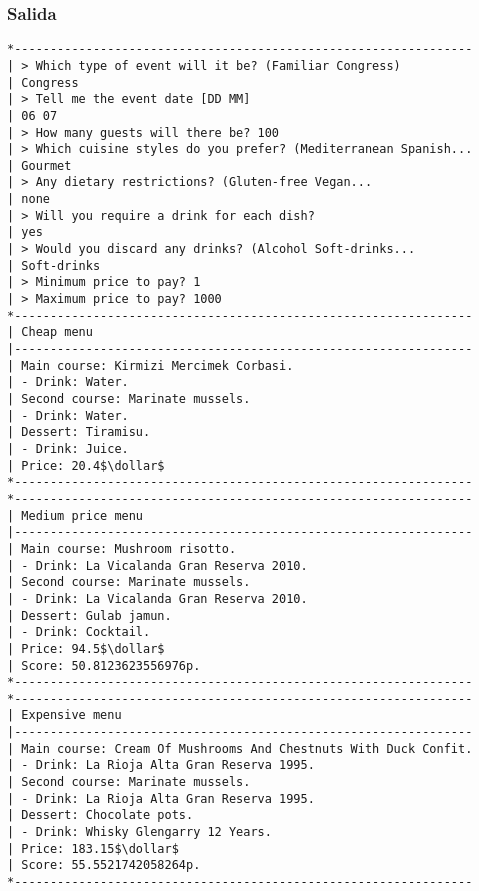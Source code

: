 \documentclass{article}
\newcommand{\dollar}{\mbox{\textdollar}}
\begin{document}
\subsubsection{Salida}
\begin{lstlisting}
*----------------------------------------------------------------
| > Which type of event will it be? (Familiar Congress)
| Congress
| > Tell me the event date [DD MM]
| 06 07
| > How many guests will there be? 100
| > Which cuisine styles do you prefer? (Mediterranean Spanish...
| Gourmet
| > Any dietary restrictions? (Gluten-free Vegan...
| none
| > Will you require a drink for each dish?
| yes
| > Would you discard any drinks? (Alcohol Soft-drinks...
| Soft-drinks
| > Minimum price to pay? 1
| > Maximum price to pay? 1000
*----------------------------------------------------------------
| Cheap menu
|----------------------------------------------------------------
| Main course: Kirmizi Mercimek Corbasi.
| - Drink: Water.
| Second course: Marinate mussels.
| - Drink: Water.
| Dessert: Tiramisu.
| - Drink: Juice.
| Price: 20.4$\dollar$
*----------------------------------------------------------------
*----------------------------------------------------------------
| Medium price menu
|----------------------------------------------------------------
| Main course: Mushroom risotto.
| - Drink: La Vicalanda Gran Reserva 2010.
| Second course: Marinate mussels.
| - Drink: La Vicalanda Gran Reserva 2010.
| Dessert: Gulab jamun.
| - Drink: Cocktail.
| Price: 94.5$\dollar$
| Score: 50.8123623556976p.
*----------------------------------------------------------------
*----------------------------------------------------------------
| Expensive menu
|----------------------------------------------------------------
| Main course: Cream Of Mushrooms And Chestnuts With Duck Confit.
| - Drink: La Rioja Alta Gran Reserva 1995.
| Second course: Marinate mussels.
| - Drink: La Rioja Alta Gran Reserva 1995.
| Dessert: Chocolate pots.
| - Drink: Whisky Glengarry 12 Years.
| Price: 183.15$\dollar$
| Score: 55.5521742058264p.
*----------------------------------------------------------------
\end{lstlisting}
\end{document}
